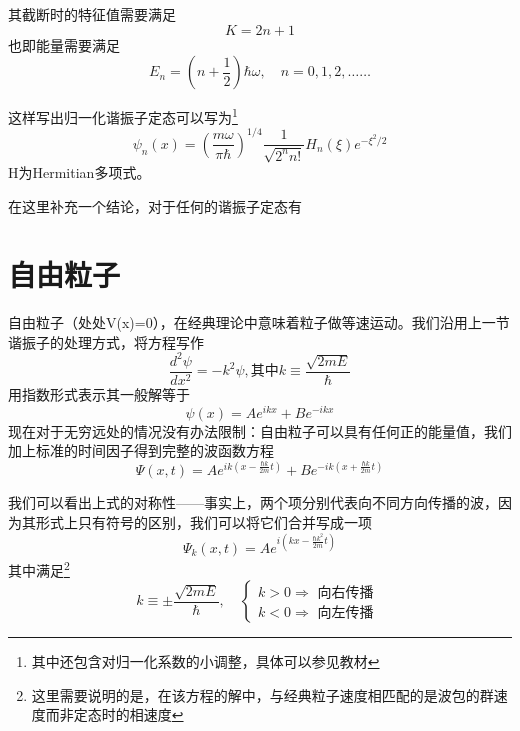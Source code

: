 		其截断时的特征值需要满足
		\begin{equation}
			K=2 n+1
		\end{equation}
		也即能量需要满足
		\begin{equation}
			E_{n}=\left(n+\frac{1}{2}\right) \hbar \omega, \quad n=0,1,2, \ldots \ldots
		\end{equation}

		这样写出归一化谐振子定态可以写为\footnote{其中还包含对归一化系数的小调整，具体可以参见教材}
		\begin{equation}
			\psi_{n}(x)=\left(\frac{m \omega}{\pi \hbar}\right)^{1 / 4} \frac{1}{\sqrt{2^{n} n !}} H_{n}(\xi) e^{-\xi^{2} / 2}
		\end{equation}
		H为Hermitian多项式。

		在这里补充一个结论，对于任何的谐振子定态有
\section{自由粒子}
	自由粒子（处处V(x)=0），在经典理论中意味着粒子做等速运动。我们沿用上一节谐振子的处理方式，将方程写作
	\begin{equation}
		\frac{d^{2} \psi}{d x^{2}}=-k^{2} \psi , 其中  k \equiv \frac{\sqrt{2 m E}}{\hbar}
	\end{equation}
	用指数形式表示其一般解等于
	\begin{equation}
		\psi(x)=A e^{i k x}+B e^{-i k x}
	\end{equation}
	现在对于无穷远处的情况没有办法限制：自由粒子可以具有任何正的能量值，我们加上标准的时间因子得到完整的波函数方程
	\begin{equation}
		\Psi(x, t)=A e^{i k\left(x-\frac{\hbar k}{2 m} t\right)}+B e^{-i k\left(x+\frac{\hbar k}{2 m} t\right)}
	\end{equation}

	我们可以看出上式的对称性——事实上，两个项分别代表向不同方向传播的波，因为其形式上只有符号的区别，我们可以将它们合并写成一项
	\begin{equation}
		\Psi_{k}(x, t)=A e^{i\left(k x-\frac{\hbar k^{2}}{2 m} t\right)}
	\end{equation}
	其中满足\footnote{这里需要说明的是，在该方程的解中，与经典粒子速度相匹配的是波包的群速度而非定态时的相速度}
	\begin{equation}
	k \equiv \pm \frac{\sqrt{2 m E}}{\hbar}, \quad\left\{\begin{array}{l}
	k>0 \Rightarrow \text { 向右传播 } \\
	k<0 \Rightarrow \text { 向左传播 }
	\end{array}\right.
	\end{equation}


